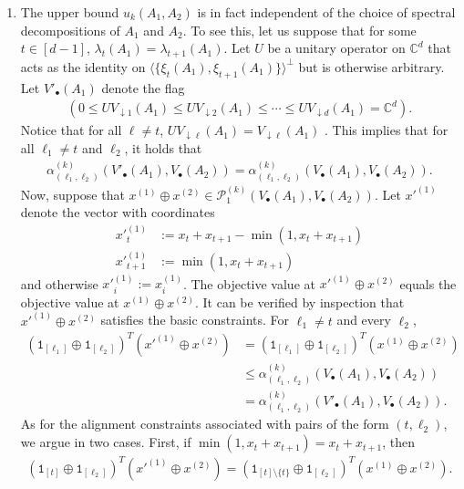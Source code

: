 \documentclass[12pt]{article}
\theoremstyle{definition}
\numberwithin{equation}{section}
\numberwithin{equation}{section}
\newcommand{\al}{\alpha}
\newcommand{\la}{\lambda}
\newcommand{\one}{\mathtt{1}}
\newcommand{\da}{\downarrow}
\newcommand{\cP}{\mathcal{P}}
\newcommand{\bC}{\mathbb{C}}
\begin{document}
\begin{enumerate}
    \item The upper bound \(u_k (A_1, A_2)\) is in fact independent of the choice of spectral decompositions of \(A_1\) and \(A_2\). To see this, let us suppose that for some \(t \in [d-1]\), \(\la_t(A_1) = \la_{t+1}(A_1)\). Let \(U\) be a unitary operator on \(\bC^d\) that acts as the identity on  \(\langle \{ \xi_t (A_1), \xi_{t+1} (A_1) \} \rangle^{\perp}\) but is otherwise arbitrary. Let \(V'_\bullet (A_1)\) denote the flag
    \begin{align}
    \label{eq: flag action}
      (0 \leq U V_{\da 1} (A_1) \leq U V_{\da 2} (A_1) \leq \cdots \leq U V_{\da d} (A_1) = \bC^d).
    \end{align}
    Notice that for all \(\ell \neq t\), \(U V_{\da \ell} (A_1) = V_{\da \ell} (A_1)\) . This implies that for all \(\ell_1 \neq t\) and \(\ell_2\), it holds that
    \begin{gather}
    \al_{(\ell_1, \ell_2)}^{(k)} (V'_\bullet (A_1), V_\bullet(A_2)) = \al_{(\ell_1, \ell_2)}^{(k)} (V_\bullet (A_1), V_\bullet(A_2)).
    \end{gather}
    Now, suppose that \(x^{(1)} \oplus x^{(2)} \in \cP_1^{(k)} (V_\bullet(A_1), V_\bullet(A_2))\). Let \(x'^{(1)}\) denote the vector with coordinates 
    \begin{align}
    x'^{(1)}_{t} &:= x_t + x_{t+1} - \min(1,x_t + x_{t+1}) \\ 
    x'^{(1)}_{t+1} &:=  \min(1, x_t + x_{t+1})
    \end{align}
    and otherwise \(x'^{(1)}_i := x^{(1)}_i\). The objective value at \(x'^{(1)} \oplus x^{(2)}\) equals the objective value at \(x^{(1)} \oplus x^{(2)}\). It can be verified by inspection that \(x'^{(1)} \oplus x^{(2)}\) satisfies the basic constraints. For \(\ell_1 \neq t\) and every \(\ell_2\), 
    \begin{align}
        (\one_{[\ell_1]} \oplus \one_{[\ell_2]})^T (x'^{(1)} \oplus x^{(2)}) &= (\one_{[\ell_1]} \oplus \one_{[\ell_2]})^T (x^{(1)} \oplus x^{(2)}) \\
        &\leq \al_{(\ell_1, \ell_2)}^{(k)} (V_\bullet (A_1), V_\bullet(A_2)) \\
        &= \al_{(\ell_1, \ell_2)}^{(k)} (V'_\bullet (A_1), V_\bullet(A_2)).
    \end{align}
    As for the alignment constraints associated with pairs of the form \((t, \ell_2)\), we argue in two cases. First, if \(\min(1,x_t + x_{t+1}) = x_t + x_{t+1}\), then 
    \begin{align}
         (\one_{[t]} \oplus \one_{[\ell_2]})^T (x'^{(1)} \oplus x^{(2)}) = (\one_{[t]\setminus\{t\}} \oplus \one_{[\ell_2]})^T (x^{(1)} \oplus x^{(2)}).

\end{align}
\end{enumerate}
\end{document}
